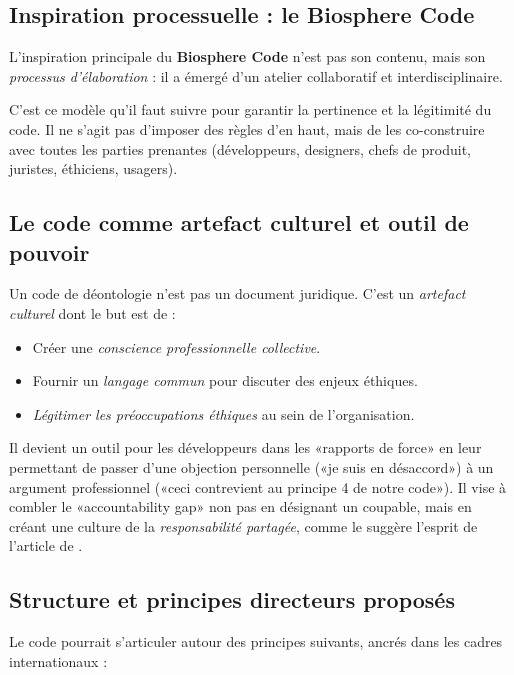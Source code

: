 \subsection{Inspiration processuelle : le Biosphere Code}
L'inspiration principale du \textbf{Biosphere Code} \citep{BiosphereCode2015} n'est pas son contenu, mais son \textit{processus d'élaboration} : il a émergé d'un atelier collaboratif et interdisciplinaire.

C'est ce modèle qu'il faut suivre pour garantir la pertinence et la légitimité du code. Il ne s'agit pas d'imposer des règles d'en haut, mais de les co-construire avec toutes les parties prenantes (développeurs, designers, chefs de produit, juristes, éthiciens, usagers).

\subsection{Le code comme artefact culturel et outil de pouvoir}
Un code de déontologie n'est pas un document juridique. C'est un \textit{artefact culturel} dont le but est de :
\begin{itemize}[label=\textbullet]
    \item Créer une \textit{conscience professionnelle collective}.
    \item Fournir un \textit{langage commun} pour discuter des enjeux éthiques.
    \item \textit{Légitimer les préoccupations éthiques} au sein de l'organisation.
\end{itemize}
Il devient un outil pour les développeurs dans les «rapports de force» en leur permettant de passer d'une objection personnelle («je suis en désaccord») à un argument professionnel («ceci contrevient au principe 4 de notre code»). Il vise à combler le «accountability gap» non pas en désignant un coupable, mais en créant une culture de la \textit{responsabilité partagée}, comme le suggère l'esprit de l'article de \citet{Neuer2019Algorithmes}.

\subsection{Structure et principes directeurs proposés}
Le code pourrait s'articuler autour des principes suivants, ancrés dans les cadres internationaux :

